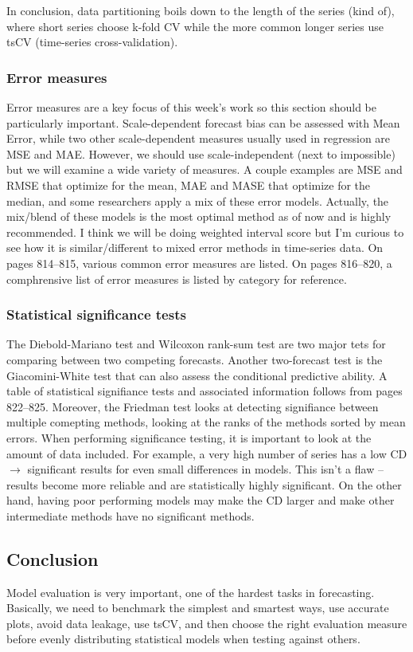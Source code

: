 \documentclass[12pt]{article}
\begin{document}
In conclusion, data partitioning boils down to the length of the series (kind of), where short series choose k-fold CV while the more common longer series use tsCV (time-series cross-validation).

\subsubsection{Error measures}
Error measures are a key focus of this week's work so this section should be particularly important. Scale-dependent forecast bias can be assessed with Mean Error, while two other scale-dependent measures usually used in regression are MSE and MAE. However, we should use scale-independent (next to impossible) but we will examine a wide variety of measures. A couple examples are MSE and RMSE that optimize for the mean, MAE and MASE that optimize for the median, and some researchers apply a mix of these error models. Actually, the mix/blend of these models is the most optimal method as of now and is highly recommended. I think we will be doing weighted interval score but I'm curious to see how it is similar/different to mixed error methods in time-series data. On pages 814--815, various common error measures are listed. On pages 816--820, a comphrensive list of error measures is listed by category for reference. 

\subsubsection{Statistical significance tests}
The Diebold-Mariano test and Wilcoxon rank-sum test are two major tets for comparing between two competing forecasts. Another two-forecast test is the Giacomini-White test that can also assess the conditional predictive ability. A table of statistical signifiance tests and associated information follows from pages 822--825. Moreover, the Friedman test looks at detecting signifiance between multiple comepting methods, looking at the ranks of the methods sorted by mean errors. When performing significance testing, it is important to look at the amount of data included. For example, a very high number of series has a low CD $\rightarrow$ significant results for even small differences in models. This isn't a flaw -- results become more reliable and are statistically highly significant. On the other hand, having poor performing models may make the CD larger and make other intermediate methods have no significant methods.

\subsection{Conclusion}
Model evaluation is very important, one of the hardest tasks in forecasting. Basically, we need to benchmark the simplest and smartest ways, use accurate plots, avoid data leakage, use tsCV, and then choose the right evaluation measure before evenly distributing statistical models when testing against others.
\end{document}
